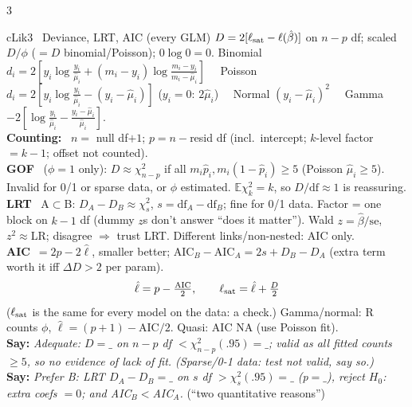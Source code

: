 \documentclass{article}
\newcommand{\h}[1]{{\bfseries #1}\ }
\newcommand{\say}[1]{{\color{cMC!75!black}\textbf{Say:}} \emph{#1}}
\newcommand{\E}{\mathbb E}
\newcommand{\sep}{\ \textbullet\ }
\begin{document}
\begin{multicols*}{3}
\begin{tb}{cLik}{3 \textbullet\ Deviance, LRT, AIC (every GLM)}
$D=2[\ell_{\rm sat}-\ell(\hat\beta)]$ on $n-p$ df; scaled $D/\phi$ ($=D$ binomial/Poisson); $0\log0=0$.
Binomial $d_i=2[y_i\log\frac{y_i}{\hat\mu_i}+(m_i-y_i)\log\frac{m_i-y_i}{m_i-\hat\mu_i}]$ \sep Poisson $d_i=2[y_i\log\frac{y_i}{\hat\mu_i}-(y_i-\hat\mu_i)]$ ($y_i{=}0$: $2\hat\mu_i$) \sep Normal $(y_i-\hat\mu_i)^2$ \sep Gamma $-2[\log\frac{y_i}{\hat\mu_i}-\frac{y_i-\hat\mu_i}{\hat\mu_i}]$.\\
\h{Counting:} $n=$ null df$+1$; $p=n-$resid df (incl.\ intercept; $k$-level factor $=k-1$; offset not counted).\\
\h{GOF} ($\phi=1$ only): $D\approx\chi^2_{n-p}$ if all $m_i\hat p_i,m_i(1-\hat p_i)\ge5$ (Poisson $\hat\mu_i\ge5$). Invalid for 0/1 or sparse data, or $\phi$ estimated. $\E\chi^2_k=k$, so $D/\text{df}\approx1$ is reassuring.\\
\h{LRT} A$\subset$B: $D_A-D_B\approx\chi^2_s$, $s=\text{df}_A-\text{df}_B$; fine for 0/1 data. Factor = one block on $k-1$ df (dummy $z$s don't answer ``does it matter''). Wald $z=\hat\beta/\text{se}$, $z^2\approx$LR; disagree $\Rightarrow$ trust LRT. Different links/non-nested: AIC only.\\
\h{AIC}$=2p-2\hat\ell$, smaller better; $\text{AIC}_B-\text{AIC}_A=2s+D_B-D_A$ (extra term worth it iff $\Delta D>2$ per param).
\[\hat\ell=p-\tfrac{\text{AIC}}2,\qquad \ell_{\rm sat}=\hat\ell+\tfrac D2\]
($\ell_{\rm sat}$ is the same for every model on the data: a check.) 
Gamma/normal: R counts $\phi$, $\hat\ell=(p+1)-\text{AIC}/2$. Quasi: AIC NA (use Poisson fit).\\
\say{Adequate: $D=\_$ on $n-p$ df $<\chi^2_{n-p}(.95)=\_$; valid as all fitted counts $\ge5$, so no evidence of lack of fit. (Sparse/0-1 data: test not valid, say so.)}\\
\say{Prefer B: LRT $D_A-D_B=\_$ on $s$ df $>\chi^2_s(.95)=\_$ (p$=\_$), reject $H_0$: extra coefs $=0$; and AIC$_B<$AIC$_A$.} (``two quantitative reasons'')
\end{tb}


\end{multicols*}
\end{document}
